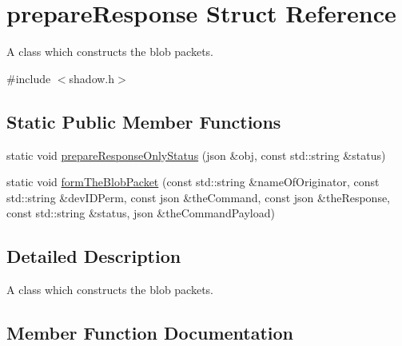 \hypertarget{structprepareResponse}{}\section{prepare\+Response Struct Reference}
\label{structprepareResponse}


A class which constructs the blob packets.  




{\ttfamily \#include $<$shadow.\+h$>$}

\subsection*{Static Public Member Functions}
\begin{DoxyCompactItemize}
\item 
static void \hyperlink{structprepareResponse_a06b9db57d391c2a2e5862319272a4778}{prepare\+Response\+Only\+Status} (json \&obj, const std\+::string \&status)
\item 
static void \hyperlink{structprepareResponse_a2a7ac61625ee38cf510d74de046c0cb8}{form\+The\+Blob\+Packet} (const std\+::string \&name\+Of\+Originator, const std\+::string \&dev\+I\+D\+Perm, const json \&the\+Command, const json \&the\+Response, const std\+::string \&status, json \&the\+Command\+Payload)
\end{DoxyCompactItemize}


\subsection{Detailed Description}
A class which constructs the blob packets. 

\subsection{Member Function Documentation}
